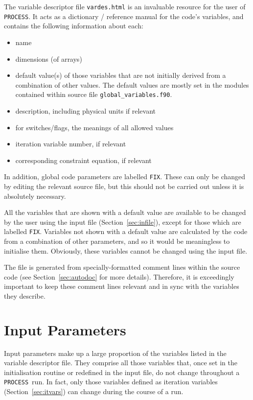 \documentclass[11pt,a4paper]{report}
\newcommand{\process}{\mbox{\texttt{PROCESS}}}
\begin{document}
The variable descriptor file \texttt{vardes.html} is an invaluable resource for
the user of \process. It acts as a dictionary / reference manual for the
code's variables, and contains the following information about each:
\begin{itemize}
\item name
\item dimensions (of arrays)
\item default value(s) of those variables that are not initially derived from
  a combination of other values. The default values are mostly set in the
  modules contained within source file \texttt{global\_variables.f90}.
\item description, including physical units if relevant
\item for switches/flags, the meanings of all allowed values
\item iteration variable number, if relevant
\item corresponding constraint equation, if relevant
\end{itemize}
In addition, global code parameters are labelled \texttt{FIX}. These can only
be changed by editing the relevant source file, but this should not be carried
out unless it is absolutely necessary.

All the variables that are shown with a default value are available to be
changed by the user using the input file (Section~\ref{sec:infile}), except
for those which are labelled \texttt{FIX}. Variables not shown with a default
value are calculated by the code from a combination of other parameters, and
so it would be meaningless to initialise them.  Obviously, these variables
cannot be changed using the input file.

The file is generated from specially-formatted comment lines within the source
code (see Section~\ref{sec:autodoc} for more details). Therefore, it is
exceedingly important to keep these comment lines relevant and in sync with
the variables they describe.

\section{Input Parameters}
\label{sec:inpars}

Input parameters make up a large proportion of the variables listed in the
variable descriptor file. They comprise all those variables that, once set in
the initialisation routine or redefined in the input file, do not change
throughout a \process\ run. In fact, only those variables defined as iteration
variables (Section~\ref{sec:itvars}) can change during the course of a run.
\end{document}

